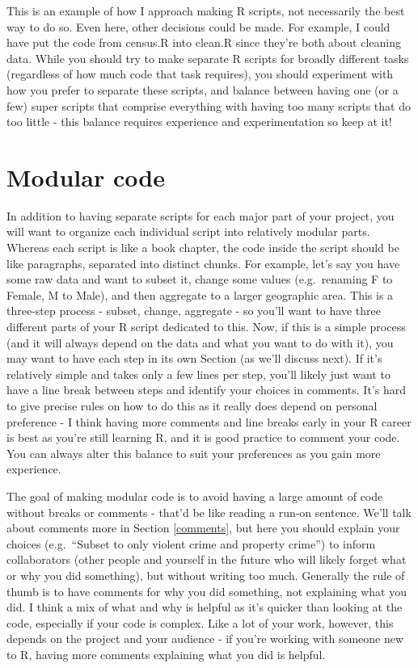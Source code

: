 \documentclass[
]{krantz}
\begin{document}
This is an example of how I approach making R scripts, not
necessarily the best way to do so. Even here, other
decisions could be made. For example, I could have put the
code from census.R into clean.R since they're both about
cleaning data. While you should try to make separate R
scripts for broadly different tasks (regardless of how much
code that task requires), you should experiment with how you
prefer to separate these scripts, and balance between having
one (or a few) super scripts that comprise everything with
having too many scripts that do too little - this balance
requires experience and experimentation so keep at it!

\hypertarget{modular-code}{%
\section{Modular code}\label{modular-code}}

In addition to having separate scripts for each major part
of your project, you will want to organize each individual
script into relatively modular parts. Whereas each script is
like a book chapter, the code inside the script should be
like paragraphs, separated into distinct chunks. For
example, let's say you have some raw data and want to subset
it, change some values (e.g.~renaming F to Female, M to
Male), and then aggregate to a larger geographic area. This
is a three-step process - subset, change, aggregate - so
you'll want to have three different parts of your R script
dedicated to this. Now, if this is a simple process (and it
will always depend on the data and what you want to do with
it), you may want to have each step in its own Section (as
we'll discuss next). If it's relatively simple and takes
only a few lines per step, you'll likely just want to have a
line break between steps and identify your choices in
comments. It's hard to give precise rules on how to do this
as it really does depend on personal preference - I think
having more comments and line breaks early in your R career
is best as you're still learning R, and it is good practice
to comment your code. You can always alter this balance to
suit your preferences as you gain more experience.

The goal of making modular code is to avoid having a large
amount of code without breaks or comments - that'd be like
reading a run-on sentence. We'll talk about comments more in
Section \ref{comments}, but here you should explain your
choices (e.g.~``Subset to only violent crime and property
crime'') to inform collaborators (other people and yourself
in the future who will likely forget what or why you did
something), but without writing too much. Generally the rule
of thumb is to have comments for why you did something, not
explaining what you did. I think a mix of what and why is
helpful as it's quicker than looking at the code, especially
if your code is complex. Like a lot of your work, however,
this depends on the project and your audience - if you're
working with someone new to R, having more comments
explaining what you did is helpful.
\end{document}
